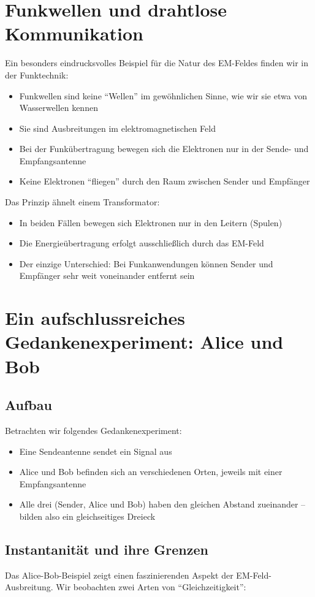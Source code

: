 \documentclass[12pt,a4paper]{article}
\begin{document}
	\section{Funkwellen und drahtlose Kommunikation}
	Ein besonders eindrucksvolles Beispiel für die Natur des EM-Feldes finden wir in der Funktechnik:
	\begin{itemize}
		\item Funkwellen sind keine ``Wellen'' im gewöhnlichen Sinne, wie wir sie etwa von Wasserwellen kennen
		\item Sie sind Ausbreitungen im elektromagnetischen Feld
		\item Bei der Funkübertragung bewegen sich die Elektronen nur in der Sende- und Empfangsantenne
		\item Keine Elektronen ``fliegen'' durch den Raum zwischen Sender und Empfänger
	\end{itemize}
	
	Das Prinzip ähnelt einem Transformator:
	\begin{itemize}
		\item In beiden Fällen bewegen sich Elektronen nur in den Leitern (Spulen)
		\item Die Energieübertragung erfolgt ausschließlich durch das EM-Feld
		\item Der einzige Unterschied: Bei Funkanwendungen können Sender und Empfänger sehr weit voneinander entfernt sein
	\end{itemize}
	
	\section{Ein aufschlussreiches Gedankenexperiment: Alice und Bob}
	\subsection{Aufbau}
	Betrachten wir folgendes Gedankenexperiment:
	\begin{itemize}
		\item Eine Sendeantenne sendet ein Signal aus
		\item Alice und Bob befinden sich an verschiedenen Orten, jeweils mit einer Empfangsantenne
		\item Alle drei (Sender, Alice und Bob) haben den gleichen Abstand zueinander -- bilden also ein gleichseitiges Dreieck
	\end{itemize}
	
	\subsection{Instantanität und ihre Grenzen}
	Das Alice-Bob-Beispiel zeigt einen faszinierenden Aspekt der EM-Feld-Ausbreitung. Wir beobachten zwei Arten von ``Gleichzeitigkeit'':
	
\end{document}
